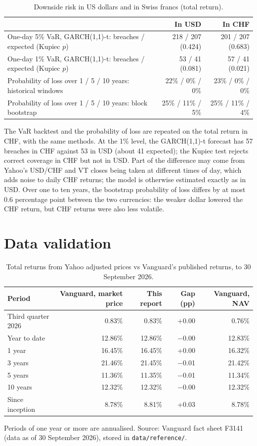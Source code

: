 \documentclass[11pt,a4paper]{article}
\newcommand{\keep}[1]{\Needspace{#1\baselineskip}}
\newcommand{\note}[1]{{\footnotesize\color{muted}#1\par}}
\begin{document}
\begin{table}[H]
\small
\caption{Downside risk in US dollars and in Swiss francs (total return).}
\begin{tabularx}{\linewidth}{L r r}
\toprule
 & \textbf{In USD} & \textbf{In CHF} \\
\midrule
One-day 5\% VaR, GARCH(1,1)-t: breaches / expected (Kupiec $p$) & 218 / 207 (0.424) & 201 / 207 (0.683) \\
One-day 1\% VaR, GARCH(1,1)-t: breaches / expected (Kupiec $p$) & 53 / 41 (0.081) & 57 / 41 (0.021) \\
Probability of loss over 1 / 5 / 10 years: historical windows & 22\% / 0\% / 0\% & 23\% / 0\% / 0\% \\
Probability of loss over 1 / 5 / 10 years: block bootstrap & 25\% / 11\% / 5\% & 25\% / 11\% / 4\% \\
\bottomrule
\end{tabularx}
\end{table}
The VaR backtest and the probability of loss are repeated on the total return in CHF, with the same methods. At the 1\% level, the GARCH(1,1)-t forecast has 57 breaches in CHF against 53 in USD (about 41 expected); the Kupiec test rejects correct coverage in CHF but not in USD. Part of the difference may come from Yahoo's USD/CHF and VT closes being taken at different times of day, which adds noise to daily CHF returns; the model is otherwise estimated exactly as in USD. Over one to ten years, the bootstrap probability of loss differs by at most 0.6 percentage point between the two currencies: the weaker dollar lowered the CHF return, but CHF returns were also less volatile.

\keep{24}
\section{Data validation}
\begin{table}[H]
\small
\caption{Total returns from Yahoo adjusted prices vs Vanguard's published returns, to 30 September 2026.}
\begin{tabularx}{\linewidth}{L r r r r}
\toprule
\textbf{Period} & \textbf{Vanguard, market price} & \textbf{This report} & \textbf{Gap (pp)} & \textbf{Vanguard, NAV} \\
\midrule
Third quarter 2026 & 0.83\% & 0.83\% & +0.00 & 0.76\% \\
Year to date & 12.86\% & 12.86\% & $-$0.00 & 12.83\% \\
1 year & 16.45\% & 16.45\% & +0.00 & 16.32\% \\
3 years & 21.46\% & 21.45\% & $-$0.01 & 21.42\% \\
5 years & 11.36\% & 11.35\% & $-$0.01 & 11.34\% \\
10 years & 12.32\% & 12.32\% & $-$0.00 & 12.32\% \\
Since inception & 8.78\% & 8.81\% & +0.03 & 8.78\% \\
\bottomrule
\end{tabularx}
\end{table}
\note{Periods of one year or more are annualised. Source: Vanguard fact sheet F3141 (data as of 30 September 2026), stored in \texttt{data/reference/}.}
\end{document}
